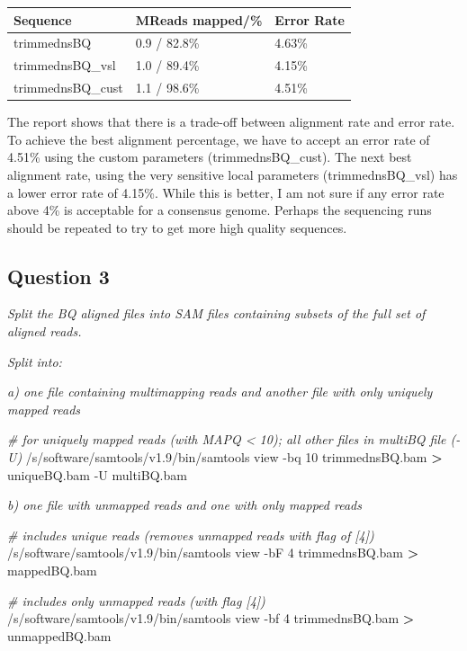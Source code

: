 \documentclass[]{article}
\newenvironment{Shaded}{\begin{snugshade}}{\end{snugshade}}
\newcommand{\CommentTok}[1]{\textcolor[rgb]{0.56,0.35,0.01}{\textit{#1}}}
\newcommand{\OperatorTok}[1]{\textcolor[rgb]{0.81,0.36,0.00}{\textbf{#1}}}
\newcommand{\ExtensionTok}[1]{#1}
\newcommand{\NormalTok}[1]{#1}
\begin{document}
\begin{longtable}[]{@{}lll@{}}
\toprule
Sequence & MReads mapped/\% & Error Rate\tabularnewline
\midrule
\endhead
trimmednsBQ & 0.9 / 82.8\% & 4.63\%\tabularnewline
trimmednsBQ\_vsl & 1.0 / 89.4\% & 4.15\%\tabularnewline
trimmednsBQ\_cust & 1.1 / 98.6\% & 4.51\%\tabularnewline
\bottomrule
\end{longtable}

The report shows that there is a trade-off between alignment rate and
error rate. To achieve the best alignment percentage, we have to accept
an error rate of 4.51\% using the custom parameters (trimmednsBQ\_cust).
The next best alignment rate, using the very sensitive local parameters
(trimmednsBQ\_vsl) has a lower error rate of 4.15\%. While this is
better, I am not sure if any error rate above 4\% is acceptable for a
consensus genome. Perhaps the sequencing runs should be repeated to try
to get more high quality sequences.

\subsection{Question 3}\label{question-3}

\emph{Split the BQ aligned files into SAM files containing subsets of
the full set of aligned reads.}

\emph{Split into:}

\emph{a) one file containing multimapping reads and another file with
only uniquely mapped reads}

\begin{Shaded}
\begin{Highlighting}[]
\CommentTok{# for uniquely mapped reads (with MAPQ < 10); all other files in multiBQ file (-U)}
\ExtensionTok{/s/software/samtools/v1.9/bin/samtools}\NormalTok{ view -bq 10 trimmednsBQ.bam }\OperatorTok{>}\NormalTok{ uniqueBQ.bam -U multiBQ.bam}
\end{Highlighting}
\end{Shaded}

\emph{b) one file with unmapped reads and one with only mapped reads}

\begin{Shaded}
\begin{Highlighting}[]
\CommentTok{# includes unique reads (removes unmapped reads with flag of [4])}
\ExtensionTok{/s/software/samtools/v1.9/bin/samtools}\NormalTok{ view -bF 4 trimmednsBQ.bam }\OperatorTok{>}\NormalTok{ mappedBQ.bam}

\CommentTok{# includes only unmapped reads (with flag [4])}
\ExtensionTok{/s/software/samtools/v1.9/bin/samtools}\NormalTok{ view -bf 4 trimmednsBQ.bam }\OperatorTok{>}\NormalTok{ unmappedBQ.bam}
\end{Highlighting}
\end{Shaded}
\end{document}
